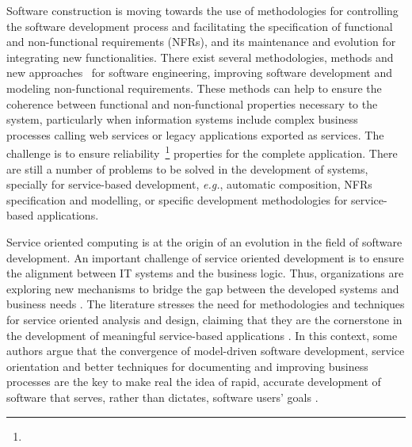 Software construction is moving towards the use of methodologies for controlling
the software development process and facilitating the specification of
functional and non-functional requirements (NFRs), and its maintenance and
evolution for integrating new functionalities. 
There exist several methodologies, methods and
new approaches~\cite{CastroMV11,PapazoglouH06,sommerville08,Gervais02,somf,MilanovicM06}
for software engineering, improving software development and modeling non-functional
requirements. These methods can help to ensure the coherence between
functional and non-functional properties necessary to the system, particularly
when information systems include complex business processes calling web services
or legacy applications exported as services. The challenge is to ensure
reliability~\footnote{} properties
for the complete application. There are still a number of problems to be solved in the development of systems, specially for service-based development, \textit{e.g.}, automatic composition, NFRs specification and
modelling, or specific development methodologies for service-based
applications.

Service oriented computing is at the origin of an evolution in the field of software development. 
An important challenge of service oriented development is to ensure the
alignment between IT systems and the business logic. Thus, organizations are 
exploring new mechanisms to bridge the gap between the developed systems and
business needs \cite{somf}. The literature stresses the need for methodologies
and techniques for service oriented analysis and design, claiming that they are
the cornerstone  in the development of meaningful service-based applications
\cite{5}.  In this context, some authors argue that the convergence of
model-driven software development, service orientation and better techniques for
documenting and improving business processes are the key to make real the idea
of rapid, accurate development of software that serves, rather than dictates,
software users' goals \cite{watson}. 

% 

